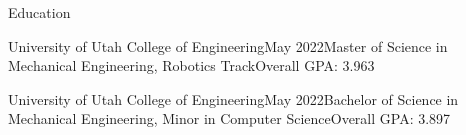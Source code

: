 \documentclass{resume}
\begin{document}
  \begin{rSection}{Education}

    \begin{rSubsection}{University of Utah College of Engineering}{May 2022}{Master of Science in Mechanical Engineering, Robotics Track}{Overall GPA: 3.963}
      \item[]
    \end{rSubsection}

    \vspace*{-7.5mm}

    \begin{rSubsection}{University of Utah College of Engineering}{May 2022}{Bachelor of Science in Mechanical Engineering, Minor in Computer Science}{Overall GPA: 3.897}
      \item[]
    \end{rSubsection}

    \vspace*{-7.5mm}

  \end{rSection}
  
\end{document}
